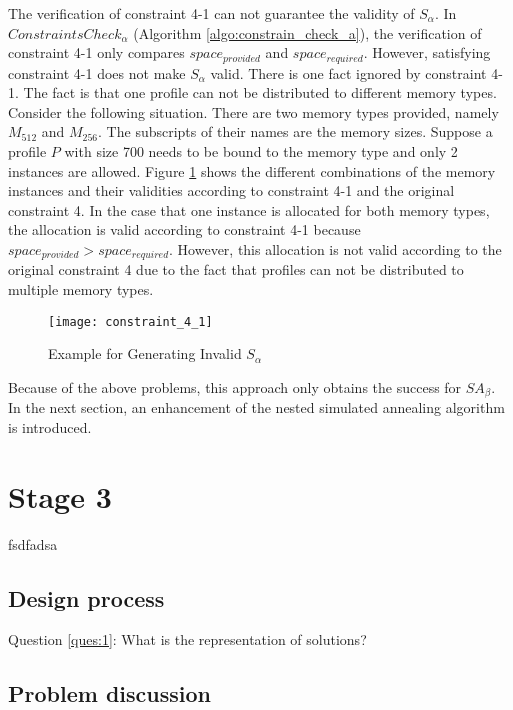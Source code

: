 		The verification of constraint 4-1 can not guarantee the validity of $S_{\alpha}$.
		In $ConstraintsCheck_{\alpha}$ (Algorithm \ref{algo:constrain_check_a}),
		the verification of constraint 4-1 only compares $space_{provided}$ and
		$space_{required}$. However, satisfying constraint 4-1 does not make $S_{\alpha}$
		valid. There is one fact ignored by constraint 4-1. The fact is that one profile
		can not be distributed to different memory types. Consider the following situation.
		There are two memory types provided, namely $M_{512}$ and $M_{256}$. The subscripts
		of their names are the memory sizes. Suppose a profile $P$ with size 700 needs to
		be bound to the memory type and only 2 instances are allowed.
		Figure \ref{fig:cons_4_1_invalid} shows the different combinations of the memory
		instances and their validities according to constraint 4-1 and the original
		constraint 4. In the case that one instance is allocated for both memory types,
		the allocation is valid according to constraint 4-1 because
		$space_{provided} > space_{required}$. However, this allocation is not valid
		according to the original constraint 4 due to the fact that profiles can not
		be distributed to multiple memory types.
		\begin{figure}[h]
			\begin{center}
				\texttt{[image: constraint\_4\_1]}
				\caption{Example for Generating Invalid $S_{\alpha}$}
				\label{fig:cons_4_1_invalid}
			\end{center}
		\end{figure}
	
		Because of the above problems, this approach only obtains the success for
		$SA_{\beta}$. In the next section, an enhancement of the nested simulated
		annealing algorithm is introduced.
		
	\section{Stage 3}
	\label{sec:stage_3}
	fsdfadsa

		\subsection{Design process}
		\label{subsec:design_3}
		Question \ref{ques:1}: What is the representation of solutions?
			
		\subsection{Problem discussion}
		\label{subsec:problem_2}	
	
	
	